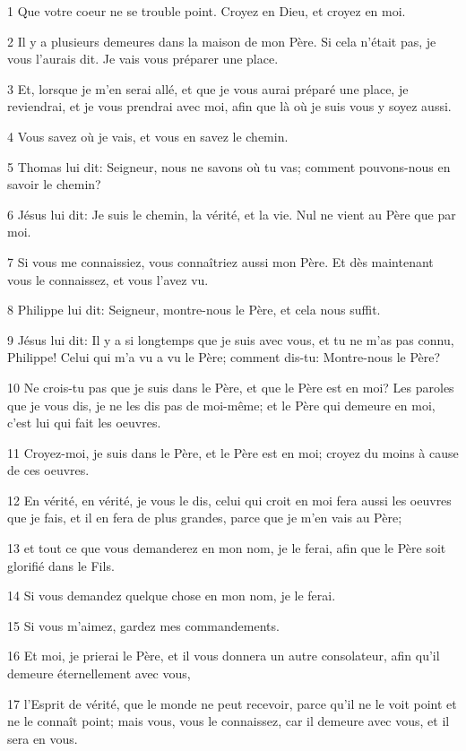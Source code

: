 \par 1 Que votre coeur ne se trouble point. Croyez en Dieu, et croyez en moi.
\par 2 Il y a plusieurs demeures dans la maison de mon Père. Si cela n'était pas, je vous l'aurais dit. Je vais vous préparer une place.
\par 3 Et, lorsque je m'en serai allé, et que je vous aurai préparé une place, je reviendrai, et je vous prendrai avec moi, afin que là où je suis vous y soyez aussi.
\par 4 Vous savez où je vais, et vous en savez le chemin.
\par 5 Thomas lui dit: Seigneur, nous ne savons où tu vas; comment pouvons-nous en savoir le chemin?
\par 6 Jésus lui dit: Je suis le chemin, la vérité, et la vie. Nul ne vient au Père que par moi.
\par 7 Si vous me connaissiez, vous connaîtriez aussi mon Père. Et dès maintenant vous le connaissez, et vous l'avez vu.
\par 8 Philippe lui dit: Seigneur, montre-nous le Père, et cela nous suffit.
\par 9 Jésus lui dit: Il y a si longtemps que je suis avec vous, et tu ne m'as pas connu, Philippe! Celui qui m'a vu a vu le Père; comment dis-tu: Montre-nous le Père?
\par 10 Ne crois-tu pas que je suis dans le Père, et que le Père est en moi? Les paroles que je vous dis, je ne les dis pas de moi-même; et le Père qui demeure en moi, c'est lui qui fait les oeuvres.
\par 11 Croyez-moi, je suis dans le Père, et le Père est en moi; croyez du moins à cause de ces oeuvres.
\par 12 En vérité, en vérité, je vous le dis, celui qui croit en moi fera aussi les oeuvres que je fais, et il en fera de plus grandes, parce que je m'en vais au Père;
\par 13 et tout ce que vous demanderez en mon nom, je le ferai, afin que le Père soit glorifié dans le Fils.
\par 14 Si vous demandez quelque chose en mon nom, je le ferai.
\par 15 Si vous m'aimez, gardez mes commandements.
\par 16 Et moi, je prierai le Père, et il vous donnera un autre consolateur, afin qu'il demeure éternellement avec vous,
\par 17 l'Esprit de vérité, que le monde ne peut recevoir, parce qu'il ne le voit point et ne le connaît point; mais vous, vous le connaissez, car il demeure avec vous, et il sera en vous.
